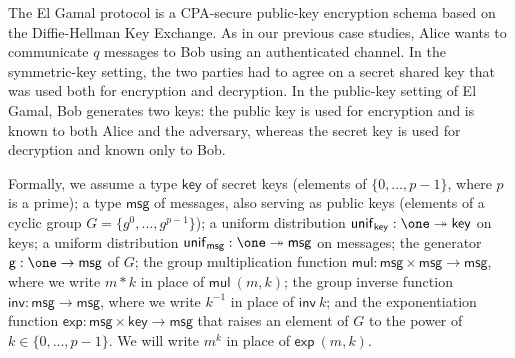 \renewcommand{\key}{\mathsf{key}}
\renewcommand{\msg}{\mathsf{msg}}
\renewcommand{\unif}{\mathsf{unif}}
\renewcommand{\gen}{\mathsf{g}}
\renewcommand{\mul}{\mathsf{mul}}
\renewcommand{\inv}{\mathsf{inv}}
\renewcommand{\exp}{\mathsf{exp}}
\renewcommand{\id}{\mathsf{id}}
\renewcommand{\adv}{\mathsf{adv}}
\renewcommand{\net}{\mathsf{net}}
\newcommand{\rec}{\mathsf{rec}}
\renewcommand{\In}{\mathsf{In}}
\renewcommand{\Out}{\mathsf{Out}}
\renewcommand{\Key}{\mathsf{Key}}
\renewcommand{\Send}{\mathsf{Send}}
\renewcommand{\Recv}{\mathsf{Recv}}
\renewcommand{\LeakMsgRcvd}{\mathsf{LeakMsgRcvd}}
\renewcommand{\OkMsg}{\mathsf{OkMsg}}
\renewcommand{\LeakCtxt}{\mathsf{LeakCtxt}}
\renewcommand{\OkCtxt}{\mathsf{OkCtxt}}
\renewcommand{\SecretKey}{\mathsf{SecretKey}}
\renewcommand{\PublicKey}{\mathsf{PublicKey}}
\newcommand{\SecretEphemeralKey}{\mathsf{SecretEphemeralKey}}
\newcommand{\PublicEphemeralKey}{\mathsf{PublicEphemeralKey}}
\newcommand{\SessionKey}{\mathsf{SessionKey}}
\renewcommand{\LeakPublicKey}{\mathsf{LeakPublicKey}}
\renewcommand{\DDH}{\mathsf{DDH}}

The El Gamal protocol is a CPA-secure public-key encryption schema based on the Diffie-Hellman Key Exchange. As in our previous case studies, Alice wants to communicate $q$ messages to Bob using an authenticated channel. In the symmetric-key setting, the two parties had to agree on a secret shared key that was used both for encryption and decryption. In the public-key setting of El Gamal, Bob generates two keys: the public key is used for encryption and is known to both Alice and the adversary, whereas the secret key is used for decryption and known only to Bob.

Formally, we assume a type $\key$ of secret keys (elements of $\{0,\ldots,p-1\}$, where $p$ is a prime); a type $\msg$ of messages, also serving as public keys (elements of a cyclic group $G = \{g^0,\ldots,g^{p-1}\}$); a uniform distribution $\unif_\key : \one \twoheadrightarrow \key$ on keys; a uniform distribution $\unif_\msg : \one \twoheadrightarrow \msg$ on messages; the generator $\gen : \one \rightarrow \msg$ of $G$; the group multiplication function $\mul : \msg \times \msg \rightarrow \msg$, where we write $m * k$ in place of $\mul \ (m,k)$; the group inverse function $\inv : \msg \rightarrow \msg$, where we write $k^{-1}$ in place of $\inv \ k$; and the exponentiation function $\exp : \msg \times \key \rightarrow \msg$ that raises an element of $G$ to the power of $k \in \{0,\ldots,p-1\}$. We will write $m^k$ in place of $\exp \ (m,k)$.

